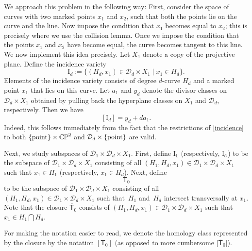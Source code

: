 \documentclass[pdftex]{sigma}
\numberwithin{equation}{section}
\begin{document}
We approach this problem in the following way: First, consider the space of curves with two marked points $x_1$ and $x_2$, such that
both the points lie on the curve and the line. Now
impose the condition that $x_1$ becomes equal to $x_2$; this is precisely where
we use the collision lemma.
Once we impose the condition that the points $x_1$ and $x_2$
have become equal,
the curve becomes tangent to this line.
We now implement this idea precisely.
Let $X_1$ denote a copy of the projective plane. Define
the incidence variety
\begin{equation}\label{f1}
\mathrm{I}_d := \{ (H_d, x_1) \in  \mathcal{D}_d \times X_1 \mid  x_1 \in H_d\}.
\end{equation}
Elements of the incidence variety consists of
degree $d$-curve $H_d$ and a marked point $x_1$ that lies on this curve.
Let $a_1$ and $y_d$ denote the divisor classes on $\mathcal{D}_d \times X_1$ obtained by pulling back the
hyperplane classes on $X_1$ and $\mathcal{D}_d$, respectively. Then we have
\begin{equation}\label{incidence}
[\mathrm{I}_d]  =  y_d + d a_1.
\end{equation}
Indeed, this follows immediately from the fact that the restrictions of \eqref{incidence} to both
$\{{\rm point}\}\times \mathbb{CP}^2$ and $\mathcal{D}_d \times \{{\rm point}\}$ are valid.

Next, we study subspaces of $\mathcal{D}_1 \times \mathcal{D}_d \times X_1$.
First, define
$\mathrm{I}_{\mathsf{L}}$ (respectively, $\mathrm{I}_{\mathcal{C}}$)
to be the subspace of $\mathcal{D}_1 \times \mathcal{D}_d \times X_1$ consisting of all
$(H_1, H_d, x_1)  \in \mathcal{D}_1 \times \mathcal{D}_d \times X_1$
such that $x_1 \in H_1$ (respectively, $x_1 \in H_d$).
Next, define
\begin{equation}
\label{et}
\mathsf{T}_0
\end{equation}
to be the subspace
of $\mathcal{D}_1 \times \mathcal{D}_d \times X_1$ consisting of all
$(H_1, H_d, x_1)  \in \mathcal{D}_1 \times \mathcal{D}_d \times X_1$ such that~$H_1$ and~$H_d$ intersect transversally at $x_1$.
Note that the closure $\overline{\mathsf{T}}_0$ consists of
$(H_1, H_d, x_1)  \in \mathcal{D}_1 \times \mathcal{D}_d \times X_1$
such that $x_1 \in H_1\bigcap H_d$.

For making the notation easier to read, we denote the homology class
represented by the closure by the notation $[\mathsf{T}_0]$
\big(as opposed to more cumbersome $\big[\overline{\mathsf{T}}_0\big]$\big).
\end{document}
